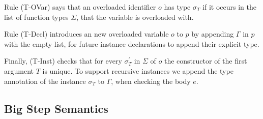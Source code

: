 \documentclass[runningheads]{llncs}
\begin{document}
Rule (T-OVar) says that an overloaded identifier $o$ has type $\sigma_T$ if it occurs in the list of function types $\Sigma$, that the variable is overloaded with. 

Rule (T-Decl) introduces an new overloaded variable $o$ to $p$ by appending $\Gamma$ in $p$ with the empty list, for future instance declarations to append their explicit type.

Finally, (T-Inst) checks that for every $\sigma_T^\prime$ in $\Sigma$ of $o$ the constructor of the first argument $T$ is unique. 
To support recursive instances we append the type annotation of the instance $\sigma_T$ to $\Gamma$, when checking the body $e$. 
\subsection{Big Step Semantics}
\label{semantics}
\end{document}
